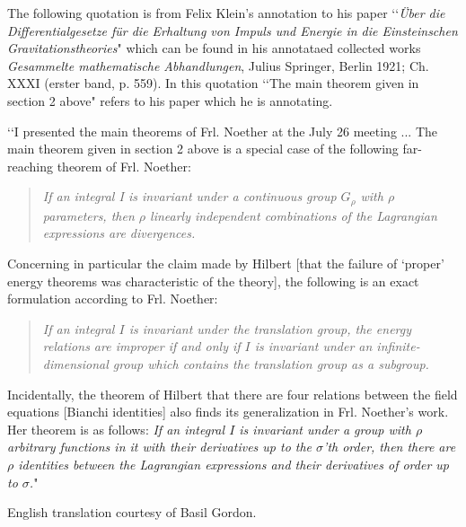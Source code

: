 
\noindent
The following quotation is from Felix Klein's annotation to his paper \lq\lq{\it{\"{U}ber die Differentialgesetze f\"{u}r
die Erhaltung von Impuls und Energie in die Einsteinschen
Gravitationstheories}}" \cite{kleinpap} which can be found in his
annotataed collected works 
 {\it{Gesammelte mathematische Abhandlungen}}, Julius Springer, Berlin 1921;
Ch. XXXI (erster band, p. 559).  In this quotation 
  \lq\lq The main theorem given in section 2 above" refers to his  paper which he is annotating.


\lq\lq I presented the main theorems of Frl.  Noether at the July 26 meeting ...
The main theorem given in section 2 above is a special case of the following
far-reaching theorem of Frl. Noether:
\begin{quote}
{\it{ If an integral I
is invariant under a continuous group $G_\rho$ with $\rho$ parameters, then
$\rho$ linearly independent combinations of the Lagrangian expressions are
divergences.}}   
\end{quote}
Concerning in particular the claim made by Hilbert
[that the failure of `proper' energy theorems was  characteristic
  of the theory], the following is an exact formulation
according to Frl.  Noether:  
\begin{quote}{\it{ If an integral $I$ is invariant under
the translation group, the energy relations are improper if and only if $I$ is
invariant under an infinite-dimensional group which contains the translation
group as a subgroup.  }} 
\end{quote}
Incidentally, the theorem of Hilbert that
there are four relations between the field equations 
[Bianchi identities]
also finds its
generalization in Frl.  Noether's work.  Her theorem is as follows:
{\it{ If an integral $I$ is invariant under a group with $\rho$
arbitrary functions in it with their derivatives up to the $\sigma$'th order,
then there are $\rho$ identities between the Lagrangian expressions and their
derivatives of order up to $\sigma$.}}" 

\noindent
English translation courtesy of Basil Gordon. 



